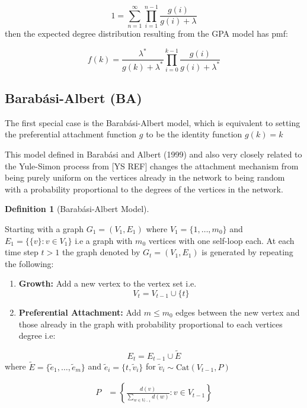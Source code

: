 \documentclass[
  10pt,
  a4paper,
]{scrreprt}
\providecommand{\tightlist}{%
  \setlength{\itemsep}{0pt}\setlength{\parskip}{0pt}}\usepackage{longtable,booktabs,array}
\theoremstyle{definition}
\newtheorem{definition}{Definition}[section]
\theoremstyle{plain}
\theoremstyle{remark}
\begin{document}
{\[
1=\sum_{n=1}^\infty \prod_{i=1}^{n-1}\displaystyle\frac{g(i)}{g(i)+\lambda}
\] then the expected degree distribution resulting from the GPA model
has pmf:

\[
f(k) = \displaystyle\frac{\lambda^*}{g(k) + \lambda^*}\prod_{i=0}^{k-1}\displaystyle\frac{g(i)}{g(i)+\lambda^*}
\]

\hypertarget{barabuxe1si-albert-ba}{%
\subsection{Barabási-Albert (BA)}\label{barabuxe1si-albert-ba}}

The first special case is the Barabási-Albert model, which is equivalent
to setting the preferential attachment function \(g\) to be the identity
function \(g(k)=k\)

This model defined in Barabási and Albert (1999) and also very closely
related to the Yule-Simon process from {[}YS REF{]} changes the
attachment mechanism from being purely uniform on the vertices already
in the network to being random with a probability proportional to the
degrees of the vertices in the network.

\begin{definition}[Barabási-Albert
Model]\protect\hypertarget{def-ba}{}\label{def-ba}

Starting with a graph \(G_1 = (V_1, E_1)\) where
\(V_1 = \{1,\ldots,m_0\}\) and \(E_1 = \{\{v\}:v\in V_1\}\) i.e a graph
with \(m_0\) vertices with one self-loop each. At each time step \(t>1\)
the graph denoted by \(G_t = (V_1, E_1)\) is generated by repeating the
following:

\begin{enumerate}
\def\labelenumi{\arabic{enumi}.}
\tightlist
\item
  \textbf{Growth:} Add a new vertex to the vertex set i.e. \[
  V_t = V_{t-1} \cup \{t\}
  \]
\item
  \textbf{Preferential Attachment:} Add \(m\le m_0\) edges between the
  new vertex and those already in the graph with probability
  proportional to each vertices degree i.e:
\end{enumerate}

\[
E_t= E_{t-1} \cup \tilde E
\] where \(\tilde E = \{\tilde e_1,\ldots, \tilde e_m\}\) and
\(\tilde e_i = \{t,\tilde v_i\}\) for
\(\tilde v_i \sim \text{Cat}(V_{t-1}, P)\)

\begin{align*}
P &= \left\{\displaystyle\frac{d(v)}{\sum_{w\in V_{t-1}} d(w)} : v \in V_{t-1}\right\}
\end{align*}


\end{definition}}
\end{document}
